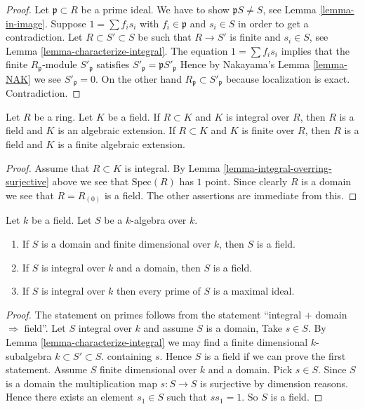 \begin{proof}
Let $\mathfrak p \subset R$ be a prime ideal.
We have to show $\mathfrak pS \not = S$, see Lemma \ref{lemma-in-image}.
Suppose $1 = \sum f_i s_i$ with $f_i \in \mathfrak p$
and $s_i \in S$ in order to get a contradiction.
Let $R \subset S' \subset S$
be such that $R\to S'$ is finite and $s_i \in S$,
see Lemma \ref{lemma-characterize-integral}.
The equation $1 = \sum f_i s_i$ implies that
the finite $R_{\mathfrak p}$-module 
$S'_{\mathfrak p}$ satisfies
$S'_{\mathfrak p} = \mathfrak pS'_{\mathfrak p}$
Hence by Nakayama's Lemma \ref{lemma-NAK}
we see $S'_{\mathfrak p} = 0$. On the other hand
$R_{\mathfrak p} \subset S'_{\mathfrak p}$ because localization
is exact. Contradiction.
\end{proof}

\begin{lemma}
\label{lemma-integral-under-field}
Let $R$ be a ring. Let $K$ be a field.
If $R \subset K$ and $K$ is integral over $R$,
then $R$ is a field and $K$ is an algebraic extension.
If $R \subset K$ and $K$ is finite over $R$,
then $R$ is a field and $K$ is a finite algebraic extension.
\end{lemma}

\begin{proof}
Assume that $R \subset K$ is integral.
By Lemma \ref{lemma-integral-overring-surjective} above we see that
$\text{Spec}(R)$ has $1$ point. Since clearly $R$ is a domain we see
that $R = R_{(0)}$ is a field. The other assertions are immediate
from this.
\end{proof}

\begin{lemma}
\label{lemma-integral-over-field}
Let $k$ be a field. Let $S$ be a $k$-algebra over $k$.
\begin{enumerate}
\item If $S$ is a domain and finite dimensional over $k$,
then $S$ is a field.
\item If $S$ is integral over $k$ and a domain,
then $S$ is a field.
\item If $S$ is integral over $k$ then every prime of
$S$ is a maximal ideal.
\end{enumerate}
\end{lemma}

\begin{proof}
The statement on primes follows from the statement
``integral $+$ domain $\Rightarrow$ field''.
Let $S$ integral over $k$ and assume $S$ is a domain,
Take $s \in S$. By Lemma
\ref{lemma-characterize-integral} we may find a 
finite dimensional $k$-subalgebra $k \subset S' \subset S$.
containing $s$. Hence $S$ is a field if we can prove the
first statement. Assume $S$ finite dimensional
over $k$ and a domain. Pick $s\in S$.
Since $S$ is a domain the multiplication
map $s : S \to S$ is surjective by dimension
reasons. Hence there exists an element $s_1 \in S$
such that $ss_1 = 1$. So $S$ is a field.
\end{proof}

